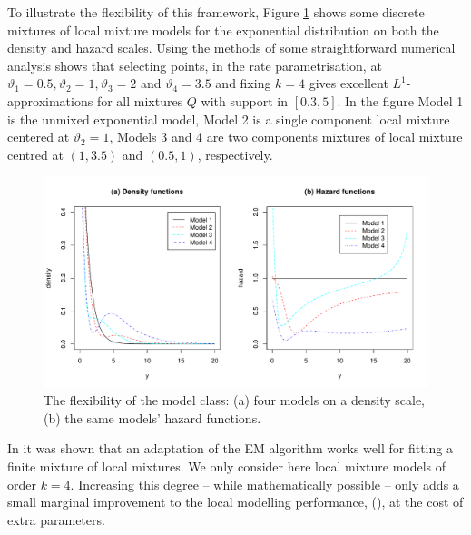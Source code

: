 \documentclass[graybox]{svmult}
\begin{document}
\begin{example} To illustrate the flexibility of this framework, Figure \ref{newfigsfig1.pdf} shows some discrete mixtures of local mixture
models for the exponential distribution on both the density and hazard scales. Using the methods of \cite[Section 2.1]{Maroufy2016a}  some straightforward numerical analysis shows that selecting points, in the rate parametrisation, at 
$\vartheta_1=0.5,  \vartheta_2=1,\vartheta_3=2$ and $\vartheta_4=3.5$ and fixing $k=4$ gives  excellent $L^1$-approximations for all mixtures $Q$ with support in $[0.3, 5]$. In the figure Model 1 is the unmixed exponential model, Model 2 is a single component local mixture centered at $\vartheta_2=1$, Models 3 and 4 are two components mixtures of local mixture centred at $(1,3.5)$  and  $(0.5,1)$, respectively. 



\begin{figure}[b]
\sidecaption
\includegraphics[scale=.45]{newfigsfig1}
%
%
\caption{The flexibility of the model class: (a) four models on a density scale, (b) the same models' hazard functions.}
\label{newfigsfig1.pdf}       %
\end{figure}

\end{example}
In  \cite{Maroufy2016a}  it was shown that an adaptation of the EM algorithm works well for fitting a finite mixture of local mixtures. We   only consider here local mixture models
of order $k = 4$. Increasing this degree -- while mathematically possible -- only adds a small marginal improvement to the local
modelling performance, (\cite{Marriott2006}), at the cost of extra parameters. 
\end{document}

